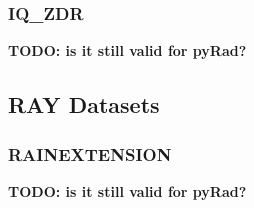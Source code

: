 \documentclass[a4paper,11pt,pdftex,twoside]{scrartcl}
\renewcommand{\bf}{\normalfont \bfseries}
\begin{document}
{{{\subsubsection{IQ\_ZDR}
\label{subsec_iq_zdr}

{\bf TODO: is it still valid for pyRad?}

%
%

\subsection{RAY Datasets}

\subsubsection{RAINEXTENSION}
\label{subsec_rainextension}

{\bf TODO: is it still valid for pyRad?}


%
%


}}}
\end{document}
